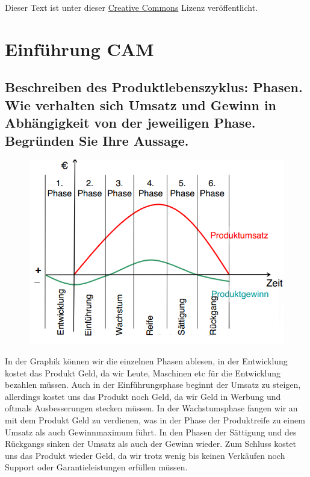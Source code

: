 




\maketitle

Dieser Text ist unter dieser \href{http://creativecommons.org/licenses/by-nc-sa/3.0/}{Creative Commons} Lizenz veröffentlicht.


\tableofcontents

\newpage

\section{Einführung CAM}

\subsection*{Beschreiben des Produktlebenszyklus: 
Phasen. Wie verhalten sich Umsatz und Gewinn in Abhängigkeit von der 
jeweiligen Phase. Begründen Sie Ihre Aussage. }


\begin{figure}[h]
\centering
\includegraphics[scale=0.7]{Bild1_1.png}
\end{figure}


In der Graphik können wir die einzelnen Phasen ablesen, in der Entwicklung kostet das Produkt Geld, da wir Leute, Maschinen etc für die Entwicklung bezahlen müssen. Auch in der Einführungsphase beginnt der Umsatz zu steigen, allerdings kostet uns das Produkt noch Geld, da wir Geld in Werbung und oftmals Ausbesserungen stecken müssen. In der Wachstumsphase fangen wir an mit dem Produkt Geld zu verdienen, was in der Phase der Produktreife zu einem Umsatz als auch Gewinnmaximum führt. In den Phasen der Sättigung und des Rückgangs sinken der Umsatz als auch der Gewinn wieder. Zum Schluss kostet uns das Produkt wieder Geld, da wir trotz wenig bis keinen Verkäufen noch Support oder Garantieleistungen erfüllen müssen.


